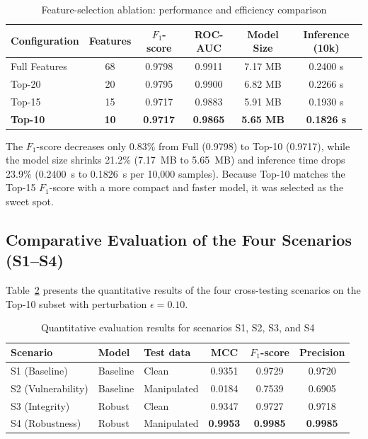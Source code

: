 \documentclass[11pt, a4paper]{article}
\begin{document}
\begin{table}[H]
\caption{Feature-selection ablation: performance and efficiency comparison}
\label{tab:ablation_selection}
\centering
\small
\begin{tabular}{@{} l c c c c c @{}}
\toprule
\textbf{Configuration} & \textbf{Features} & \textbf{$F_1$-score} & \textbf{ROC-AUC} & \textbf{Model Size} & \textbf{Inference (10k)} \\ \midrule
Full Features & 68 & 0.9798 & 0.9911 & 7.17 MB & 0.2400 s \\
Top-20        & 20 & 0.9795 & 0.9900 & 6.82 MB & 0.2266 s \\
Top-15        & 15 & 0.9717 & 0.9883 & 5.91 MB & 0.1930 s \\
\textbf{Top-10} & \textbf{10} & \textbf{0.9717} & \textbf{0.9865} & \textbf{5.65 MB} & \textbf{0.1826 s} \\ \bottomrule
\end{tabular}
\end{table}

The $F_1$-score decreases only 0.83\% from Full (0.9798) to Top-10 (0.9717), while the model size shrinks 21.2\% (7.17~MB to 5.65~MB) and inference time drops 23.9\% (0.2400~s to 0.1826~s per 10{,}000 samples). Because Top-10 matches the Top-15 $F_1$-score with a more compact and faster model, it was selected as the sweet spot.

\subsection{Comparative Evaluation of the Four Scenarios (S1--S4)}
Table~\ref{tab:results_2x2} presents the quantitative results of the four cross-testing scenarios on the Top-10 subset with perturbation $\epsilon = 0.10$.

\begin{table}[H]
\caption{Quantitative evaluation results for scenarios S1, S2, S3, and S4}
\label{tab:results_2x2}
\centering
\small
\begin{tabular}{@{} l l l c c c @{}}
\toprule
\textbf{Scenario} & \textbf{Model} & \textbf{Test data} & \textbf{MCC} & \textbf{$F_1$-score} & \textbf{Precision} \\ \midrule
S1 (Baseline)      & Baseline & Clean       & 0.9351 & 0.9729 & 0.9720 \\
S2 (Vulnerability) & Baseline & Manipulated & 0.0184 & 0.7539 & 0.6905 \\
S3 (Integrity)     & Robust   & Clean       & 0.9347 & 0.9727 & 0.9718 \\
S4 (Robustness)    & Robust   & Manipulated & \textbf{0.9953} & \textbf{0.9985} & \textbf{0.9985} \\ \bottomrule
\end{tabular}
\end{table}
\end{document}
